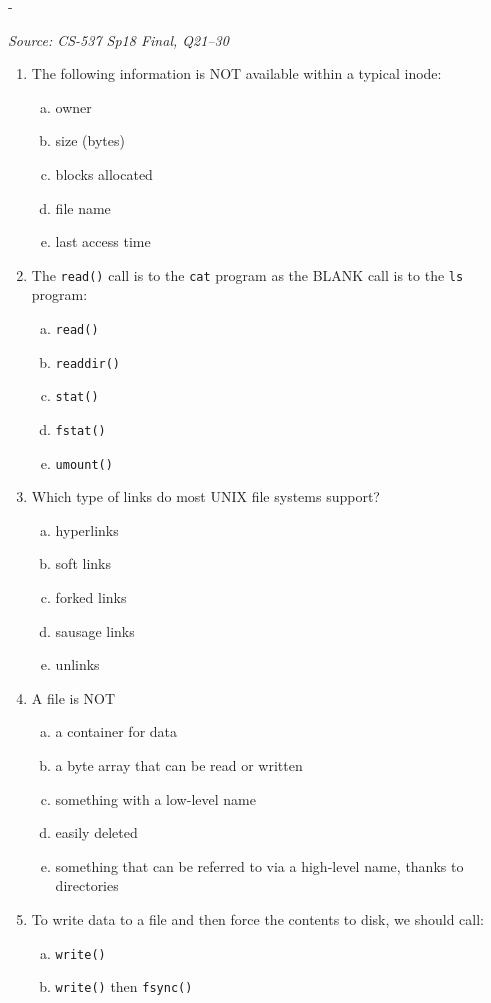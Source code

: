 \documentclass[11pt,a4paper]{article}
\makeatletter
\newcommand{\keepspace}[1]{\par\penalty-100\begingroup
  \setlength{\dimen@}{#1}\dimen@ii\pagegoal\advance\dimen@ii-\pagetotal
  \ifdim\dimen@>\dimen@ii\ifdim\dimen@ii>\z@\vfil\fi\break\fi\endgroup}
\newcounter{qn}[section]
\newenvironment{Qn}[4]{%
  \refstepcounter{qn}\keepspace{7\baselineskip}%
  \begin{tcolorbox}[qboxstyle, title={Q\thesection.\theqn\ \ [#1 \textbar\ #2]\ \ #4}]%
  {\footnotesize\color{g3}\textit{Source: #3}}\par\smallskip%
}{%
  \end{tcolorbox}%
}
\makeatother
\begin{document}
\begin{Qn}{Easy-Medium}{Lect 23}{CS-537 Sp18 Final, Q21--30}{File descriptors, \texttt{open}/\texttt{unlink}/\texttt{lseek}/\texttt{fsync}/\texttt{rename}}
\begin{enumerate}[(21)]
\begin{enumerate}[(a)]
\end{enumerate}
\item The following information is NOT available within a typical inode:
\begin{enumerate}[(a)]
\item owner
\item size (bytes)
\item blocks allocated
\item file name
\item last access time
\end{enumerate}
\item The \texttt{read()} call is to the \texttt{cat} program as the
      BLANK call is to the \texttt{ls} program:
\begin{enumerate}[(a)]
\item \texttt{read()}
\item \texttt{readdir()}
\item \texttt{stat()}
\item \texttt{fstat()}
\item \texttt{umount()}
\end{enumerate}
\item Which type of links do most UNIX file systems support?
\begin{enumerate}[(a)]
\item hyperlinks
\item soft links
\item forked links
\item sausage links
\item unlinks
\end{enumerate}
\item A file is NOT
\begin{enumerate}[(a)]
\item a container for data
\item a byte array that can be read or written
\item something with a low-level name
\item easily deleted
\item something that can be referred to via a high-level name, thanks
      to directories
\end{enumerate}
\item To write data to a file and then force the contents to disk, we
      should call:
\begin{enumerate}[(a)]
\item \texttt{write()}
\item \texttt{write()} then \texttt{fsync()}

\end{enumerate}
\end{enumerate}
\end{Qn}
\end{document}
